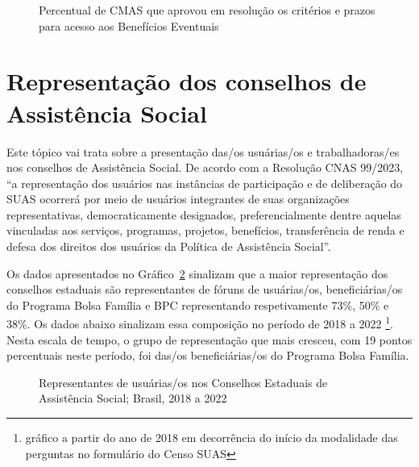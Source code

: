 \documentclass[
  letterpaper,
  DIV=11,
  numbers=noendperiod]{scrreprt}
\begin{document}
\begin{figure}


\caption{\label{fig-cmas_be}Percentual de CMAS que aprovou em resolução
os critérios e prazos para acesso aos Benefícios Eventuais}

\end{figure}%

\section{Representação dos conselhos de Assistência
Social}\label{representauxe7uxe3o-dos-conselhos-de-assistuxeancia-social}

Este tópico vai trata sobre a presentação das/os usuárias/os e
trabalhadoras/es nos conselhos de Assistência Social. De acordo com a
Resolução CNAS 99/2023, ``a representação dos usuários nas instâncias de
participação e de deliberação do SUAS ocorrerá por meio de usuários
integrantes de suas organizações representativas, democraticamente
designados, preferencialmente dentre aquelas vinculadas aos serviços,
programas, projetos, benefícios, transferência de renda e defesa dos
direitos dos usuários da Política de Assistência Social''.

Os dados apresentados no Gráfico~\ref{fig-usu_ceas} sinalizam que a
maior representação dos conselhos estaduais são representantes de fóruns
de usuárias/os, beneficiárias/os do Programa Bolsa Família e BPC
representando respetivamente 73\%, 50\% e 38\%. Os dados abaixo
sinalizam essa composição no período de 2018 a 2022 \footnote{gráfico a
  partir do ano de 2018 em decorrência do início da modalidade das
  perguntas no formulário do Censo SUAS}. Nesta escala de tempo, o grupo
de representação que mais cresceu, com 19 pontos percentuais neste
período, foi das/os beneficiárias/os do Programa Bolsa Família.

\begin{figure}


\caption{\label{fig-usu_ceas}Representantes de usuárias/os nos Conselhos
Estaduais de Assistência Social; Brasil, 2018 a 2022}

\end{figure}%
\end{document}
